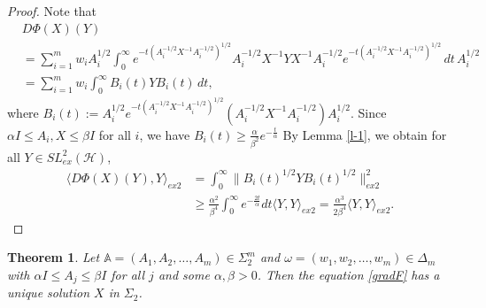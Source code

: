 \documentclass[12pt,reqno]{amsart}
\newtheorem{theorem}{Theorem}[section]
\begin{document}
\begin{proof}
Note that
\begin{align*}
& D \Phi(X)(Y) \\
&= \sum_{i=1}^{m} w_i   A_i^{1/2} \int_0^\infty e^{-t (A_i^{-1/2} X^{-1} A_i^{-1/2})^{1/2}} A_i^{-1/2} X^{-1} Y X^{-1} A_i^{-1/2} e^{-t (A_i^{-1/2} X^{-1} A_i^{-1/2})^{1/2}} \, dt \, A_i^{1/2} \\
& = \sum_{i=1}^{m} w_i \int_0^\infty B_{i}(t) Y B_{i}(t) \, dt,
\end{align*}
where $B_{i}(t) := A_i^{1/2} e^{-t (A_i^{-1/2} X^{-1} A_i^{-1/2})^{1/2}} (A_i^{-1/2} X^{-1} A_i^{-1/2} ) A_i^{1/2}$.
Since $\alpha I \leq A_{i}, X \leq \beta I$ for all $i$, we have $B_{i}(t) \geq \frac{\alpha}{\beta^{2}} e^{-\frac{t}{\alpha}}$
By Lemma \ref{l-1}, we obtain for all $Y \in SL^{2}_{ex} (\mathcal{H})$,
\begin{displaymath}
\begin{split}
\langle D\Phi(X)(Y), Y \rangle_{ex2} & = \int_0^\infty \| B_{i}(t)^{1/2} Y B_{i}(t)^{1/2} \|_{ex 2}^{2} \\
& \geq \frac{\alpha^2}{\beta^{4}} \int_0^\infty e^{-\frac{2t}{\alpha}} dt \langle Y, Y \rangle_{ex2} = \frac{\alpha^3}{2\beta^4} \langle Y, Y \rangle_{ex2}.
\end{split}
\end{displaymath}
\end{proof}


\begin{theorem} \label{T:Wass_P}
Let $\mathbb{A } =(A_1, A_2, \ldots, A_m) \in \Sigma_2^{m}$ and $\omega = (w_{1}, w_{2}, \dots, w_{m}) \in \Delta_{m}$ with $\alpha I \leq A_j \leq \beta I$ for all $j$ and some $\alpha, \beta > 0$. Then the equation \eqref{gradF} has a unique solution $X$ in $\Sigma_2 $.
\end{theorem}
\end{document}
